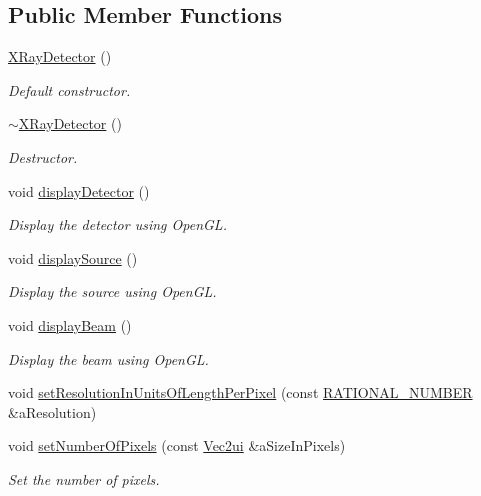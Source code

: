 \subsection*{Public Member Functions}
\begin{DoxyCompactItemize}
\item 
\hyperlink{classg_virtual_x_ray_1_1_x_ray_detector_aa711b947ac963941891c1f8c61cc7ff8}{XRayDetector} ()
\begin{DoxyCompactList}\small\item\em Default constructor. \end{DoxyCompactList}\item 
\hyperlink{classg_virtual_x_ray_1_1_x_ray_detector_afcfac202d93f170ff1d8c8e92849ab3e}{$\sim$XRayDetector} ()
\begin{DoxyCompactList}\small\item\em Destructor. \end{DoxyCompactList}\item 
void \hyperlink{classg_virtual_x_ray_1_1_x_ray_detector_a0b33600bfa074ac167ea604ba38f664c}{displayDetector} ()
\begin{DoxyCompactList}\small\item\em Display the detector using OpenGL. \end{DoxyCompactList}\item 
void \hyperlink{classg_virtual_x_ray_1_1_x_ray_detector_a378f40f0e8d3a7798488f1ed21d44694}{displaySource} ()
\begin{DoxyCompactList}\small\item\em Display the source using OpenGL. \end{DoxyCompactList}\item 
void \hyperlink{classg_virtual_x_ray_1_1_x_ray_detector_aed46b4bae356dfdcfa5e73382f6fb4c5}{displayBeam} ()
\begin{DoxyCompactList}\small\item\em Display the beam using OpenGL. \end{DoxyCompactList}\item 
void \hyperlink{classg_virtual_x_ray_1_1_x_ray_detector_ab542086c90a3d96e45ebe8d965c25938}{setResolutionInUnitsOfLengthPerPixel} (const \hyperlink{namespace_utilities_a40969b96bd8d847b962e297cb79f08ce}{RATIONAL\_\-NUMBER} \&aResolution)
\item 
void \hyperlink{classg_virtual_x_ray_1_1_x_ray_detector_a6ed821d0fc9c41184d8745f5615caae0}{setNumberOfPixels} (const \hyperlink{class_math_1_1_vec2}{Vec2ui} \&aSizeInPixels)
\begin{DoxyCompactList}\small\item\em Set the number of pixels. \end{DoxyCompactList}\item 

\end{DoxyCompactItemize}
